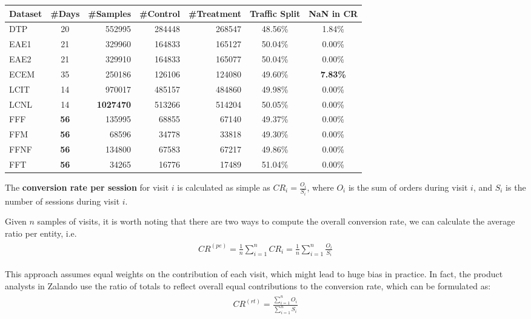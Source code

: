 \documentclass[paper=a4, fontsize=11pt]{scrartcl} %
\numberwithin{equation}{section} %
\numberwithin{figure}{section} %
\numberwithin{table}{section} %
\begin{document}
\begin{center}
  \begin{tabular}{ | l | c | r | r | r | c | c |}
    \hline
    \textbf{Dataset} & \textbf{\#Days}  & \textbf{\#Samples} & \textbf{\#Control} & \textbf{\#Treatment} &  \textbf{Traffic Split} & \textbf{NaN in CR} \\ \hline\hline
     DTP & 20 & 552995 & 284448 & 268547 & 48.56\% & 1.84\% \\ \hline
     EAE1 & 21 & 329960 & 164833 & 165127 & 50.04\% & 0.00\% \\ \hline
     EAE2 & 21 & 329910 & 164833 & 165077 & 50.04\% & 0.00\% \\ \hline
     ECEM & 35 & 250186 & 126106 & 124080 & 49.60\% & \textbf{7.83\%} \\ \hline
     LCIT & 14 & 970017 & 485157 & 484860 & 49.98\% & 0.00\% \\ \hline
     LCNL & 14 & \textbf{1027470} & 513266 & 514204 & 50.05\% & 0.00\% \\ \hline
     FFF & \textbf{56} & 135995 & 68855 & 67140 & 49.37\% & 0.00\% \\ \hline
     FFM & \textbf{56} & 68596 & 34778 & 33818 & 49.30\% & 0.00\% \\ \hline
     FFNF & \textbf{56} & 134800 & 67583 & 67217 & 49.86\% & 0.00\% \\ \hline
     FFT & \textbf{56} & 34265 & 16776 & 17489 & 51.04\% & 0.00\% \\ \hline
  \end{tabular}
\end{center}

The \textbf{conversion rate per session} for visit $i$ is calculated as simple as $CR_i = \frac{O_i}{S_i}$, where $O_i$ is the sum of orders during visit $i$, and $S_i$ is the number of sessions during visit $i$.

Given $n$ samples of visits, it is worth noting that there are two ways to compute the overall conversion rate, we can calculate the average ratio per entity, i.e.
\begin{align} 
\begin{split}
CR^{(pe)} = \frac{1}{n} \sum_{i=1}^{n} CR_i = \frac{1}{n} \sum_{i=1}^{n} \frac{O_i}{S_i}
\end{split}					
\end{align}

This approach assumes equal weights on the contribution of each visit, which might lead to huge bias in practice. In fact, the product analysts in Zalando use the ratio of totals to reflect overall equal contributions to the conversion rate, which can be formulated as:
\begin{align} 
\begin{split}
CR^{(rt)} = \frac{\sum_{i=1}^{n}O_i}{\sum_{i=1}^{n}S_i} 
\end{split}					
\end{align}
\end{document}
